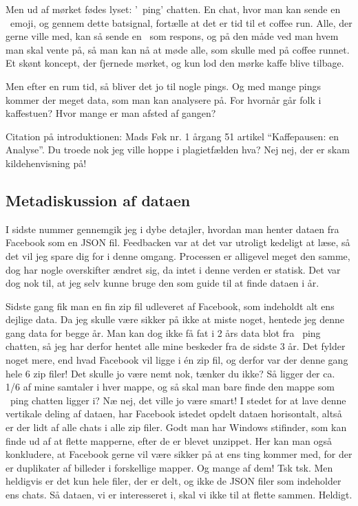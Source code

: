 \begin{article}
Men ud af mørket fødes lyset: '\coffee\ ping' chatten.
En chat, hvor man kan sende en \coffee\ emoji, og gennem dette batsignal, fortælle at det er tid til et coffee run. Alle, der gerne ville med, kan så sende en \coffee\ som respons, og på den måde ved man hvem man skal vente på, så man kan nå at møde alle, som skulle med på coffee runnet. Et skønt koncept, der fjernede mørket, og kun lod den mørke kaffe blive tilbage.

Men efter en rum tid, så bliver det jo til nogle pings. Og med mange pings kommer der meget data, som man kan analysere på. For hvornår går folk i kaffestuen? Hvor mange er man afsted af gangen?

Citation på introduktionen: Mads Føk nr. 1 årgang 51 artikel ``Kaffepausen: en Analyse''.
Du troede nok jeg ville hoppe i plagietfælden hva? Nej nej, der er skam kildehenvisning på!


\subsection*{Metadiskussion af dataen}

I sidste nummer gennemgik jeg i dybe detajler, hvordan man henter dataen fra Facebook som en JSON fil. Feedbacken var at det var utroligt kedeligt at læse, så det vil jeg spare dig for i denne omgang. Processen er alligevel meget den samme, dog har nogle overskifter ændret sig, da intet i denne verden er statisk. Det var dog nok til, at jeg selv kunne bruge den som guide til at finde dataen i år.

Sidste gang fik man en fin zip fil udleveret af Facebook, som indeholdt alt ens dejlige data.
Da jeg skulle være sikker på ikke at miste noget, hentede jeg denne gang data for begge år. Man kan dog ikke få fat i 2 års data blot fra \coffee\ ping chatten, så jeg har derfor hentet alle mine beskeder fra de sidste 3 år.
Det fylder noget mere, end hvad Facebook vil ligge i én zip fil, og derfor var der denne gang hele 6 zip filer!
Det skulle jo være nemt nok, tænker du ikke? Så ligger der ca. 1/6 af mine samtaler i hver mappe, og så skal man bare finde den mappe som \coffee\ ping chatten ligger i?
Næ nej, det ville jo være smart! I stedet for at lave denne vertikale deling af dataen, har Facebook istedet opdelt dataen horisontalt, altså er der lidt af alle chats i alle zip filer. Godt man har Windows stifinder, som kan finde ud af at flette mapperne, efter de er blevet unzippet.
Her kan man også konkludere, at Facebook gerne vil være sikker på at ens ting kommer med, for der er duplikater af billeder i forskellige mapper. Og mange af dem! Tsk tsk.
Men heldigvis er det kun hele filer, der er delt, og ikke de JSON filer som indeholder ens chats. Så dataen, vi er interesseret i, skal vi ikke til at flette sammen. Heldigt.


\end{article}
